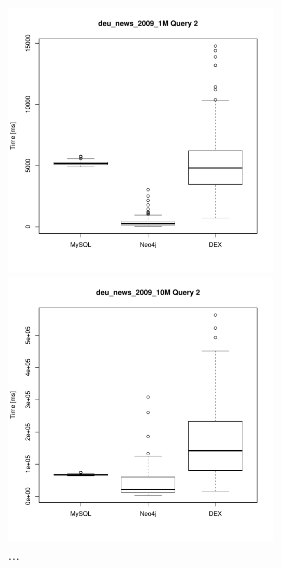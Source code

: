 \documentclass[11pt, a4paper, oneside]{article} %
\begin{document}
\begin{appendix}
\begin{figure}[ht]
\begin{minipage}[hbt]{7cm}
	\centering
	\includegraphics[width=7cm]{../results/cold caches/images/1M_query2_boxplot}
	\caption{...}
	\label{fig:1M_query2_boxplot}
\end{minipage}
\hfill
\begin{minipage}[hbt]{7cm}
	\centering
	\includegraphics[width=7cm]{../results/cold caches/images/10M_query2_boxplot}
	\caption{...}
	\label{fig:10M_query2_boxplot}
\end{minipage}


\end{figure}
\end{appendix}
\end{document}
